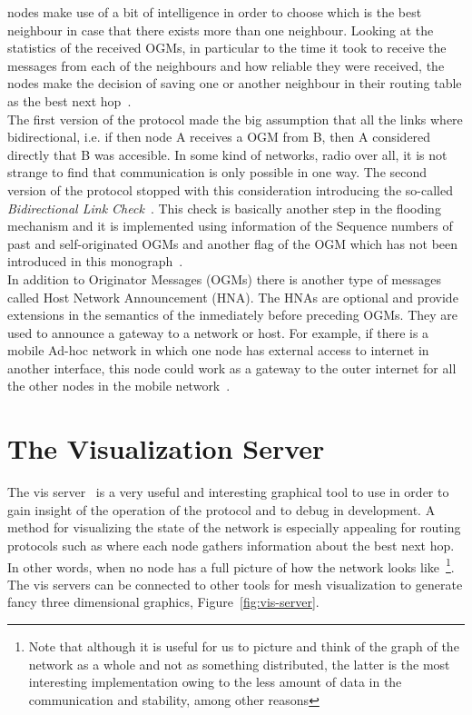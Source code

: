 \documentclass[a4paper]{article}
\begin{document}
\vspace{2mm}
\batman nodes make use of a bit of intelligence in order to choose which is the
best neighbour in case that there exists more than one neighbour. Looking at the
statistics of the received OGMs, in particular to the time it took to receive
the messages from each of the neighbours and how reliable they were received,
the nodes make the decision of saving one or another neighbour in their routing
table as the best next hop~\cite{batmanProtocol}. \\

\vspace{2mm}
The first version of the protocol made the big assumption that all the links
where bidirectional, i.e. if then node A receives a OGM from B, then A
considered directly that B was accesible. In some kind of networks, radio over
all, it is not strange to find that communication is only possible in one way.
The second version of the protocol stopped with this consideration introducing
the so-called \emph{Bidirectional Link Check}~\cite{batmanWikipedia}. This 
check is basically  another step in the flooding mechanism and it is implemented 
using information of the Sequence numbers of past and self-originated OGMs and 
another flag of the OGM which has not been introduced in this 
monograph~\cite{batmanRFC}.  \\

\vspace{2mm}
In addition to Originator Messages (OGMs) there is another type of messages
called Host Network Announcement (HNA). The HNAs are optional and provide
extensions in the semantics of the inmediately before preceding OGMs. They are
used to announce a gateway to a network or host. For example, if there is a
\batman mobile Ad-hoc network in which one node has external access to internet
in another interface, this node could work as a gateway to the outer internet 
for all the other nodes in the mobile network~\cite{batmanRFC}.  \\

\section{The Visualization Server}

The vis server~\cite{visServer} is a very useful and interesting graphical tool 
to use in order to gain insight of the operation of the protocol and to debug in
development. A method for visualizing the state of the network is especially 
appealing for routing protocols such as \batman where each node gathers 
information about the best next hop. In other words, when no node has a full
picture of how the network looks like~\footnote{ Note that although it is useful
for us to picture and think of the graph of the network as a whole and not as 
something distributed, the latter is the most interesting implementation owing
to the less amount of data in the communication and stability, among other
reasons}. The vis servers can be connected to other tools for mesh visualization to 
generate fancy three dimensional graphics, Figure~\ref{fig:vis-server}.
\end{document}

